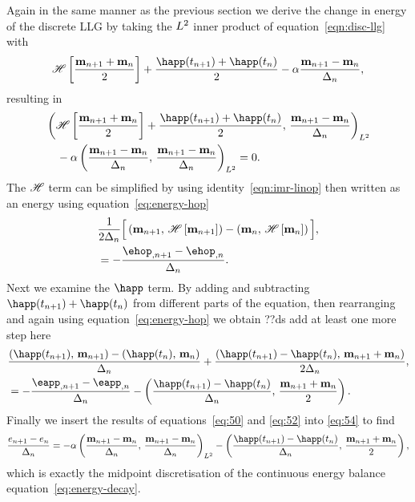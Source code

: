 Again in the same manner as the previous section we derive the change in energy of the discrete LLG by taking the $L^2$ inner product of equation~\eqref{eqn:disc-llg} with
\begin{equation}
  \mphop + \frac{\happ(t_{n+1}) + \happ(t_n)}{2} - \dampc \mpdmdt,
\end{equation}
resulting in
\begin{equation}
  \begin{aligned}
    &\ltip{\mphop + \frac{\happ(t_{n+1}) + \happ(t_n)}{2}}{\mpdmdt} \\
    & \quad - \dampc \ltip{\mpdmdt}{\mpdmdt} = 0.
    \label{eq:54}
  \end{aligned}
\end{equation}
The $\mathscr{H}$ term can be simplified by using identity~\eqref{eqn:imr-linop} then written as an energy using equation~\eqref{eq:energy-hop}
\begin{equation}
  \begin{aligned}
    &\frac{1}{2\dtn} \Big[\ip{\mv_{n+1}}{\hop \left[\mv_{n+1} \right]}
      - \ip{\mv_{n}}{ \hop\left[ \mv_{n} \right]} \Big], \\
    &= -\frac{\ehop_{,n+1} - \ehop_{,n}}{\dtn}.
  \end{aligned}
  \label{eq:50}
\end{equation}
Next we examine the $\happ$ term. By adding and subtracting $\happ(t_{n+1}) + \happ(t_n)$ from different parts of the equation, then rearranging and again using equation~\eqref{eq:energy-hop} we obtain
??ds add at least one more step here
\begin{equation}
  \begin{aligned}
    &\frac{ \ip{\happ(t_{n+1})}{\mv_{n+1}} - \ip{\happ(t_n)}{\mv_{n}}}{\dtn}
    + \frac{\ip{\happ(t_{n+1}) -\happ(t_n)}{\mv_{n+1} + \mv_{n}}}{2\dtn}, \\
    &= -\frac{\eapp_{, n+1} - \eapp_{, n}}{\dtn}
    - \ip{\frac{\happ(t_{n+1}) -\happ(t_n)}{\dtn}}{\frac{\mv_{n+1} + \mv_{n}}{2}}.
  \end{aligned}
  \label{eq:52}
\end{equation}
Finally we insert the results of equations~\eqref{eq:50} and \eqref{eq:52} into \eqref{eq:54} to find
\begin{equation}
  \frac{\e_{n+1} - \e_n}{\dtn}
  = -\dampc \ltip{\mpdmdt}{\mpdmdt}
  - \ip{\frac{\happ(t_{n+1}) -\happ(t_n)}{\dtn}}{\frac{\mv_{n+1} + \mv_{n}}{2}},
\label{eqn:imr-llg-energy}
\end{equation}
which is exactly the midpoint discretisation of the continuous energy balance equation~\eqref{eq:energy-decay}.

